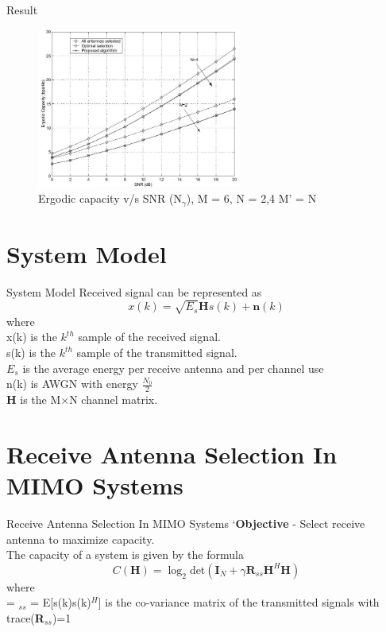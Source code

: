 \documentclass{beamer}
\begin{document}
\begin{frame}{Result}
\begin{figure}[h]
\centering
\includegraphics[width=0.6\textwidth]{SNR.JPG}
\caption{Ergodic capacity v/s SNR (N$_\gamma$), M = 6, N = 2,4 M' = N}
\end{figure}
\end{frame}

\section{System Model}
\begin{frame}{System Model}
Received signal can be represented as 
\begin{equation*}
    x(k) =\sqrt{E_s}\boldsymbol{H}s(k)+ \boldsymbol{n}(k)
\end{equation*}
where\\
\vskip 0.1in
x(k) is the $k^{th}$ sample of the received signal.\\
\vskip 0.1in
s(k) is the $k^{th}$ sample of the transmitted signal.\\
\vskip 0.1in
$E_s$ is the average energy per receive antenna and per channel use\\
\vskip 0.1in
n(k)  is AWGN with energy $\textstyle\frac{N_0}{2}$\\
\vskip 0.1in
\textbf{H} is the M$\times$N channel matrix.
\end{frame}
\section{Receive Antenna Selection In MIMO Systems}
\begin{frame}{Receive Antenna Selection In MIMO Systems}
`\textbf{Objective} - Select receive antenna to maximize capacity.\\
The capacity of a system is given by the formula
\begin{equation*}
    C(\boldsymbol{H})=\log_{2}\text{det}(\boldsymbol{I}_{N} + \gamma\boldsymbol{R}_{ss}\boldsymbol{H}^{H}\boldsymbol{H})
\end{equation*}
where\\
\vskip 0.2in
\gamma = \textstyle{}
\newline
\newline
{}$_{ss}$ = E[s(k)s(k)$^H$] is the co-variance matrix of the transmitted signals with trace(\textbf{R}$_{ss}$)=1
\end{frame}
\end{document}
